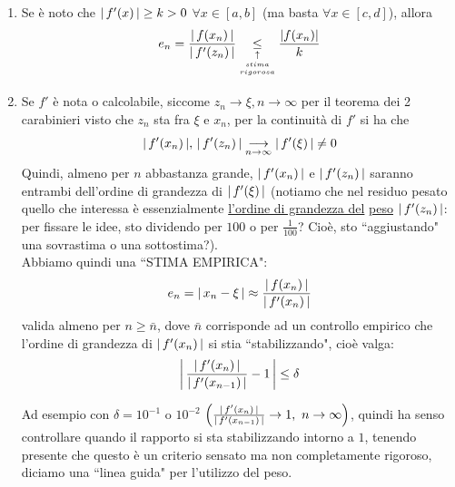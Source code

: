 \documentclass[12pt]{article}
\DeclarePairedDelimiter{\abs}{\lvert}{\rvert}
\begin{document}
\begin{enumerate}[label=\roman*)]
\item Se è noto che $\abs{\,f'(x)\,} \ge k >0$ $\forall x \in [a,b]$ (ma basta $\forall x \in [c,d]$), allora
\[e_n = \frac{\abs{\,f(x_n)\,}}{\abs{\,f'(z_n)\,}} \underset{\underset{\underset{rigorosa}{stima}}{\uparrow}}{\le} \frac{|f(x_n)|}{k} \]

\item Se $f'$ è nota o calcolabile, siccome $z_n \to \xi, n \to \infty$ per il teorema dei 2 carabinieri visto che $z_n$ sta fra $\xi$ e $x_n$, per la continuità di $f'$ si ha che
\[ \abs{\,f'(x_n)\,}, \, \abs{\,f'(z_n)\,} \underset{n \to \infty}{\longrightarrow} \abs{\,f'(\xi)\,} \ne 0 \]
Quindi, almeno per $n$ abbastanza grande, $\abs{\,f'(x_n)\,}$ e $\abs{\,f'(z_n)\,}$  saranno entrambi dell'ordine di grandezza di $\abs{\,f'(\xi)\,}$ (notiamo che nel residuo pesato quello che interessa è essenzialmente \uline{l'ordine di grandezza del} \uline{peso} $\abs{\,f'(z_n)\,}$: per fissare le idee, sto dividendo per $100$ o per $\frac{1}{100}$? Cioè, sto ``aggiustando" una sovrastima o una sottostima?).\\
Abbiamo quindi una ``STIMA EMPIRICA":
\[ e_n = \abs{\,x_n-\xi\,} \approx \frac{\abs{\,f(x_n)\,}}{\abs{\,f'(x_n)\,}} \] 
valida almeno per $n \ge \bar{n}$, dove $\bar{n}$ corrisponde ad un controllo empirico che l'ordine di grandezza di $\abs{\,f'(x_n)\,}$ si stia ``stabilizzando", cioè valga:
\[ \abs*{\,\frac{\abs{\,f'(x_n)\,}}{\abs{\,f'(x_{n-1})\,}}-1\,} \le \delta \]


Ad esempio con $\delta = 10^{-1}$ o $10^{-2}$ $\left(\frac{\abs{\,f'(x_n)\,}}{\abs{\,f'(x_{n-1})\,}} \to 1,\ n \to \infty \right)$, quindi ha senso controllare quando il rapporto si sta stabilizzando intorno a $1$, tenendo presente che questo è un criterio sensato ma non completamente rigoroso, diciamo una ``linea guida" per l'utilizzo del peso.


\end{enumerate}
\end{document}
